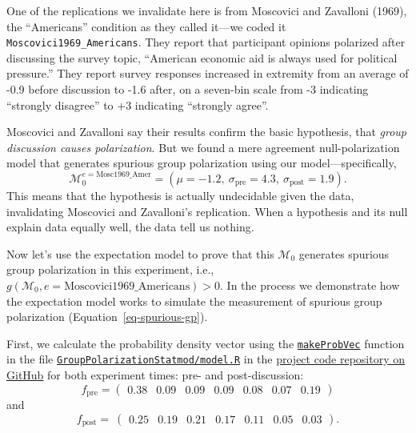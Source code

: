\documentclass[preview]{article}
\newcommand{\nullmodel}{\mathcal{M}_0}
\begin{document}
One of the replications we invalidate here is from Moscovici and
Zavalloni (1969), the ``Americans'' condition as they called it---we
coded it \texttt{Moscovici1969\_Americans}. They report that participant
opinions polarized after discussing the survey topic, ``American
economic aid is always used for political pressure.'' They report survey
responses increased in extremity from an average of -0.9 before
discussion to -1.6 after, on a seven-bin scale from -3 indicating
``strongly disagree'' to +3 indicating ``strongly agree''.

Moscovici and Zavalloni say their results confirm the basic hypothesis,
that \emph{group discussion causes polarization}. But we found a mere
agreement null-polarization model that generates spurious group
polarization using our model—specifically,
\begin{equation}
  \nullmodel^{e=\text{Mosc1969\_Amer}} = 
    (\mu = -1.2,~\sigma_\mathrm{pre}= 4.3,~\sigma_\mathrm{post}= 1.9).
  \label{eq:Moscovici1969_Americans_Null}
\end{equation}
\noindent
This means that the hypothesis is actually undecidable given the data,
invalidating Moscovici and Zavalloni's replication. When a hypothesis
and its null explain data equally well, the data tell us nothing.

Now let's use the expectation model to prove that this $\nullmodel$ generates
spurious group polarization in this experiment, i.e.,
$g(\nullmodel, e= \mathrm{Moscovici1969\_Americans}) > 0$. In the process we
demonstrate how the expectation model works to simulate the measurement
of spurious group polarization (Equation~\ref{eq-spurious-gp}).

First, we calculate the probability density vector using the
\href{https://github.com/mt-digital/gp-statmod/blob/main/GroupPolarizationStatmod/model.R\#L44}{\texttt{makeProbVec}}
function in the file
\href{https://github.com/mt-digital/gp-statmod/blob/main/GroupPolarizationStatmod/model.R}{\texttt{GroupPolarizationStatmod/model.R}}
in the \href{https://github.com/mt-digital/gp-statmod}{project code
repository on GitHub} for both experiment times: pre- and
post-discussion: \[
f_\mathrm{pre} = 
\begin{pmatrix}
  0.38 & 0.09 & 0.09 & 0.09 & 0.08 & 0.07 & 0.19
\end{pmatrix}
\] and \[
f_\mathrm{post} = \
\begin{pmatrix} 
0.25 & 0.19 & 0.21 & 0.17 & 0.11 & 0.05 & 0.03 
\end{pmatrix}.
\]
\end{document}
